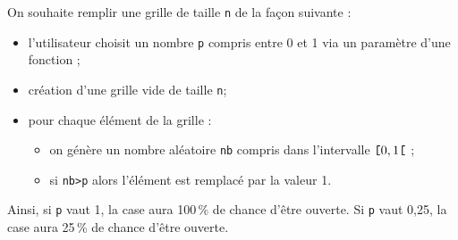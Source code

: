 On souhaite remplir une grille de taille \lstinline{n} de la façon suivante : 
\begin{itemize}
\item l'utilisateur choisit un nombre \lstinline{p} compris entre 0 et 1 via un paramètre d'une fonction ;
\item création d'une grille vide de taille \lstinline{n};
\item pour chaque élément de la grille :
\begin{itemize}
\item on génère un nombre aléatoire \lstinline{nb} compris dans l'intervalle $\verb![!0,1\verb![!$ ;
\item si \lstinline{nb>p} alors l'élément est remplacé par la valeur 1. 
\end{itemize}
\end{itemize}


Ainsi, si \lstinline{p} vaut 1, la case aura 100\,\% de chance d'être ouverte. Si \lstinline{p} vaut 0,25, la case aura 25\,\% de chance d'être ouverte.





